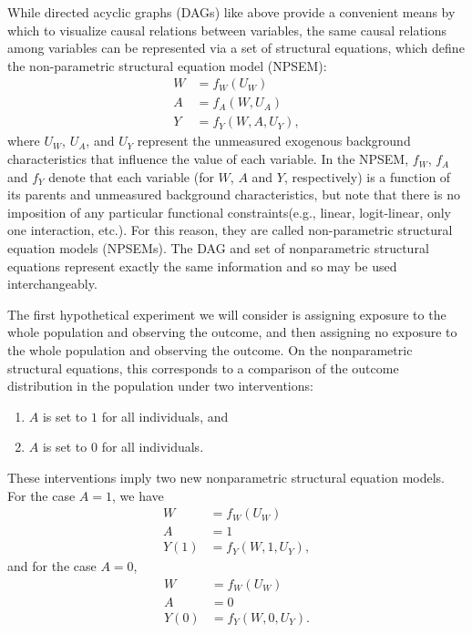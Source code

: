 \documentclass[
  12pt, krantz2,
]{book}
\providecommand{\tightlist}{%
  \setlength{\itemsep}{0pt}\setlength{\parskip}{0pt}}
\theoremstyle{definition}
\theoremstyle{definition}
\theoremstyle{definition}
\newcommand{\1}{\mathbbm{1}}
\begin{document}
While directed acyclic graphs (DAGs) like above provide a convenient means by
which to visualize causal relations between variables, the same causal
relations among variables can be represented via a set of structural equations,
which define the non-parametric structural equation model (NPSEM):
\begin{align*}
  W &= f_W(U_W) \\
  A &= f_A(W, U_A) \\
  Y &= f_Y(W, A, U_Y),
\end{align*}
where \(U_W\), \(U_A\), and \(U_Y\) represent the unmeasured exogenous background
characteristics that influence the value of each variable. In the NPSEM, \(f_W\),
\(f_A\) and \(f_Y\) denote that each variable (for \(W\), \(A\) and \(Y\), respectively)
is a function of its parents and unmeasured background characteristics, but note
that there is no imposition of any particular functional constraints(e.g.,
linear, logit-linear, only one interaction, etc.). For this reason, they are
called non-parametric structural equation models (NPSEMs). The
DAG and set of nonparametric structural equations represent exactly the same
information and so may be used interchangeably.

The first hypothetical experiment we will consider is assigning exposure to the
whole population and observing the outcome, and then assigning no exposure to
the whole population and observing the outcome. On the nonparametric structural
equations, this corresponds to a comparison of the outcome distribution in the
population under two interventions:

\begin{enumerate}
\def\labelenumi{\arabic{enumi}.}
\tightlist
\item
  \(A\) is set to \(1\) for all individuals, and
\item
  \(A\) is set to \(0\) for all individuals.
\end{enumerate}

These interventions imply two new nonparametric structural equation models. For
the case \(A = 1\), we have
\begin{align*}
  W &= f_W(U_W) \\
  A &= 1 \\
  Y(1) &= f_Y(W, 1, U_Y),
\end{align*}
and for the case \(A=0\),
\begin{align*}
  W &= f_W(U_W) \\
  A &= 0 \\
  Y(0) &= f_Y(W, 0, U_Y).
\end{align*}
\end{document}
